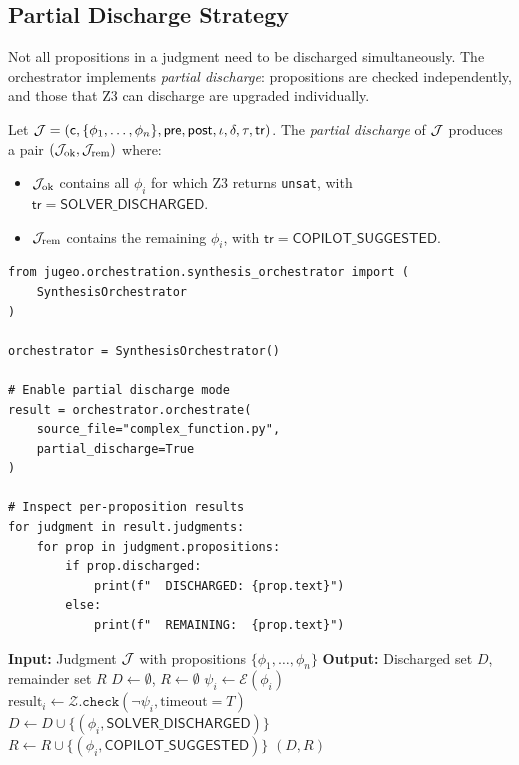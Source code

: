 \documentclass[11pt]{article}
\newcommand{\CopilotSugg}{\ensuremath{\mathsf{COPILOT\_SUGGESTED}}}
\newcommand{\SolverDisch}{\ensuremath{\mathsf{SOLVER\_DISCHARGED}}}
\newcommand{\props}{\Phi}                           %
\newcommand{\precond}{\mathsf{pre}}                  %
\newcommand{\postcond}{\mathsf{post}}                %
\providecommand{\inv}{\iota}                         %
\newcommand{\tr}{\mathsf{tr}}                        %
\newcommand{\smtenc}{\mathcal{E}}
\begin{document}
\subsection{Partial Discharge Strategy}

Not all propositions in a judgment need to be discharged simultaneously.
The orchestrator implements \emph{partial discharge}: propositions are
checked independently, and those that Z3 can discharge are upgraded
individually.

\begin{definition}\label{def:partial-discharge}
Let $\J = (\coord, \{\phi_1, \ldots, \phi_n\}, \precond, \postcond,
\inv, \delta, \tau, \tr)$.  The \emph{partial discharge} of $\mathcal{J}$
produces a pair $(\mathcal{J}_{\text{ok}}, \mathcal{J}_{\text{rem}})$ where:
\begin{itemize}[noitemsep]
  \item $\mathcal{J}_{\text{ok}}$ contains all $\phi_i$ for which Z3 returns
        \texttt{unsat}, with $\tr = \SolverDisch$.
  \item $\mathcal{J}_{\text{rem}}$ contains the remaining $\phi_i$, with
        $\tr = \CopilotSugg$.
\end{itemize}
\end{definition}

\begin{lstlisting}[style=jugeo-python]
from jugeo.orchestration.synthesis_orchestrator import (
    SynthesisOrchestrator
)

orchestrator = SynthesisOrchestrator()

# Enable partial discharge mode
result = orchestrator.orchestrate(
    source_file="complex_function.py",
    partial_discharge=True
)

# Inspect per-proposition results
for judgment in result.judgments:
    for prop in judgment.propositions:
        if prop.discharged:
            print(f"  DISCHARGED: {prop.text}")
        else:
            print(f"  REMAINING:  {prop.text}")
\end{lstlisting}

\begin{algorithm}[H]
\caption{Partial Discharge Protocol}
\label{alg:partial-discharge}
\begin{algorithmic}[1]
\STATE \textbf{Input:} Judgment $\mathcal{J}$ with propositions $\{\phi_1, \ldots, \phi_n\}$
\STATE \textbf{Output:} Discharged set $D$, remainder set $R$
\STATE $D \gets \emptyset$, $R \gets \emptyset$
\FOR{each $\phi_i \in \J.\props$}
  \STATE $\psi_i \gets \smtenc(\phi_i)$
  \STATE $\text{result}_i \gets \mathcal{Z}.\texttt{check}(\neg\psi_i, \text{timeout}=T)$
    \STATE $D \gets D \cup \{(\phi_i, \SolverDisch)\}$
  \ELSE
    \STATE $R \gets R \cup \{(\phi_i, \CopilotSugg)\}$
  \ENDIF
\ENDFOR
\RETURN $(D, R)$
\end{algorithmic}
\end{algorithm}
\end{document}
